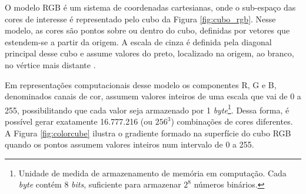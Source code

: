 O modelo RGB é um sistema de coordenadas cartesianas, onde o sub-espaço das cores de interesse é representado pelo cubo da Figura \ref{fig:cubo_rgb}. Nesse modelo, as cores são pontos sobre ou dentro do cubo, definidas por vetores que estendem-se a partir da origem. A escala de cinza é definida pela diagonal principal desse cubo e assume valores do preto, localizado na origem, ao branco, no vértice mais distante \citep{woods:2000:book}.

Em representações computacionais desse modelo os componentes R, G e B, denominados canais de cor, assumem valores inteiros de uma escala que vai de 0 a 255, possibilitando que cada valor seja armazenado por 1 \textit{byte}\footnote{Unidade de medida de armazenamento de memória em computação. Cada \textit{byte} contém 8 \textit{bits}, suficiente para armazenar $2^8$ números binários.}. Dessa forma, é possível gerar exatamente 16.777.216 (ou $256^3$) combinações de cores diferentes. A Figura \ref{fig:colorcube} ilustra o gradiente formado na superfície do cubo RGB quando os pontos assumem valores inteiros num intervalo de 0 a 255.

